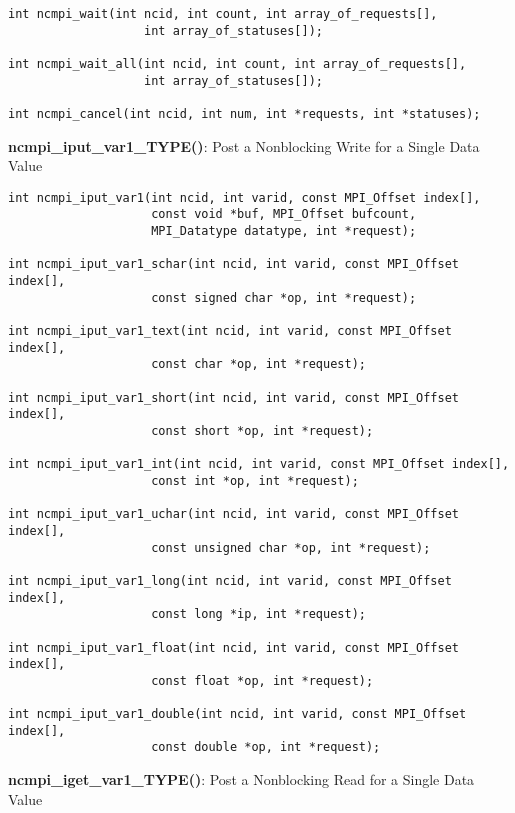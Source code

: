 \begin{verbatim}
int ncmpi_wait(int ncid, int count, int array_of_requests[],
                   int array_of_statuses[]);

int ncmpi_wait_all(int ncid, int count, int array_of_requests[],
                   int array_of_statuses[]);

int ncmpi_cancel(int ncid, int num, int *requests, int *statuses);
\end{verbatim}


{\bf ncmpi\_iput\_var1\_TYPE()}: Post a Nonblocking Write for a Single Data Value

\begin{verbatim}
int ncmpi_iput_var1(int ncid, int varid, const MPI_Offset index[],
                    const void *buf, MPI_Offset bufcount,
                    MPI_Datatype datatype, int *request); 

int ncmpi_iput_var1_schar(int ncid, int varid, const MPI_Offset index[],
                    const signed char *op, int *request); 

int ncmpi_iput_var1_text(int ncid, int varid, const MPI_Offset index[],
                    const char *op, int *request); 

int ncmpi_iput_var1_short(int ncid, int varid, const MPI_Offset index[],
                    const short *op, int *request); 

int ncmpi_iput_var1_int(int ncid, int varid, const MPI_Offset index[],
                    const int *op, int *request); 

int ncmpi_iput_var1_uchar(int ncid, int varid, const MPI_Offset index[],
                    const unsigned char *op, int *request);

int ncmpi_iput_var1_long(int ncid, int varid, const MPI_Offset index[],
                    const long *ip, int *request);

int ncmpi_iput_var1_float(int ncid, int varid, const MPI_Offset index[],
                    const float *op, int *request); 

int ncmpi_iput_var1_double(int ncid, int varid, const MPI_Offset index[],
                    const double *op, int *request); 
\end{verbatim}


{\bf ncmpi\_iget\_var1\_TYPE()}: Post a Nonblocking Read for a Single Data Value

